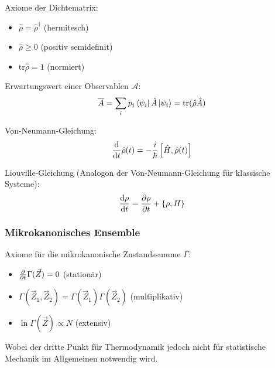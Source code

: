 			\noindent
			Axiome der Dichtematrix:
			\begin{itemize}\itemsep -0pt	%
				\item $\hat{\rho} = \hat{\rho}^\dagger$ \hfill{(hermitesch)}
				\item $\hat{\rho} \ge 0 $ \hfill{(positiv semidefinit)}
				\item $\mathrm{tr} \hat{\rho} = 1$ \hfill{(normiert)}
			\end{itemize}

			\noindent
			Erwartungswert einer Observablen $\mathcal{A}$:
			\begin{equation}
				\overline{A} = \sum_i p_i \Bra{\psi_i}\hat{A}\Ket{\psi_i} = \mathrm{tr} (\hat{\rho}\hat{A})
			\end{equation}

			\noindent
			Von-Neumann-Gleichung:
			\begin{equation}
				\frac{\mathrm{d} }{\mathrm{d} t}\hat{\rho}(t) = -\frac{i}{\hbar} \left[\hat{H},\hat{\rho}(t)\right]
			\end{equation}

			\noindent
			Liouville-Gleichung (Analogon der Von-Neumann-Gleichung für klassische Systeme):
			\begin{equation}
				\frac{\mathrm{d} \rho}{\mathrm{d} t} = \frac{\partial \rho}{\partial t}+\left\lbrace \rho,H \right\rbrace
			\end{equation}

		\subsubsection{Mikrokanonisches Ensemble}
			\noindent
			Axiome für die mikrokanonische Zustandssumme $\Gamma$:
			\begin{itemize}\itemsep -0pt	%
				\item $\frac{\partial }{\partial t}\Gamma(\vec{Z}) = 0$ \hfill{(stationär)}
				\item $\Gamma(\vec{Z}_1,\vec{Z}_2) = \Gamma(\vec{Z}_1)\Gamma(\vec{Z}_2) $ \hfill{(multiplikativ)}
				\item $\ln\Gamma(\vec{Z}) \propto N$ \hfill{(extensiv)}
			\end{itemize}
			Wobei der dritte Punkt für Thermodynamik jedoch nicht für statistische Mechanik im Allgemeinen notwendig wird.

